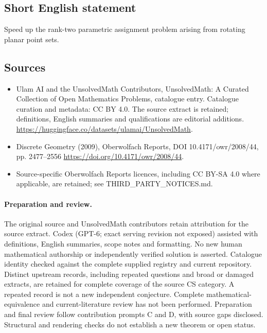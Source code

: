 \documentclass[11pt]{article}
\begin{document}
\subsection{Short English statement}
Speed up the rank-two parametric assignment problem arising from rotating planar point sets.
\subsection{Sources}
\begin{itemize}
\item[\hypertarget{source:statement:1}{S1}] Ulam AI and the UnsolvedMath Contributors, UnsolvedMath: A Curated Collection of Open Mathematics Problems, catalogue entry. Catalogue curation and metadata: CC BY 4.0. The source extract is retained; definitions, English summaries and qualifications are editorial additions.
\url{https://huggingface.co/datasets/ulamai/UnsolvedMath}.
\item[\hypertarget{source:statement:2}{S2}] Discrete Geometry (2009), Oberwolfach Reports, DOI 10.4171/owr/2008/44, pp. 2477--2556
\url{https://doi.org/10.4171/owr/2008/44}.
\item Source-specific Oberwolfach Reports licences, including CC BY-SA 4.0 where applicable, are retained; see THIRD\_PARTY\_NOTICES.md.
\end{itemize}
\paragraph{Preparation and review.}
The original source and UnsolvedMath contributors retain attribution for the source extract. Codex (GPT-6; exact serving revision not exposed) assisted with definitions, English summaries, scope notes and formatting. No new human mathematical authorship or independently verified solution is asserted. Catalogue identity checked against the complete supplied registry and current repository. Distinct upstream records, including repeated questions and broad or damaged extracts, are retained for complete coverage of the source CS category. A repeated record is not a new independent conjecture. Complete mathematical-equivalence and current-literature review has not been performed. Preparation and final review follow contribution prompts C and D, with source gaps disclosed. Structural and rendering checks do not establish a new theorem or open status.
\label{end:statement}
\end{document}
